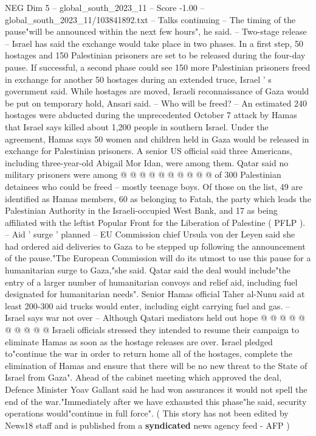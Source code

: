 \begin{textsample}{NEG Dim 5 – global\_south\_2023\_11 – Score -1.00 – global\_south\_2023\_11/103841892.txt}  \label{ex:f5_neg_173}
-- Talks continuing -- The timing of the pause"will be announced within the next few hours", he said. -- Two-stage release -- Israel has said the exchange would take place in two phases.
In a first step, 50 hostages and 150 Palestinian prisoners are set to be released during the four-day pause.
If successful, a second phase could see 150 more Palestinian prisoners freed in exchange for another 50 hostages during an extended truce, Israel ' s government said.
While hostages are moved, Israeli reconnaissance of Gaza would be put on temporary hold, Ansari said. -- Who will be freed? -- An estimated 240 hostages were abducted during the unprecedented October 7 attack by Hamas that Israel says killed about 1,200 people in southern Israel.
Under the agreement, Hamas says 50 women and children held in Gaza would be released in exchange for Palestinian prisoners.
A senior US official said three Americans, including three-year-old Abigail Mor Idan, were among them.
Qatar said no military prisoners were among @ @ @ @ @ @ @ @ @ @ of 300 Palestinian detainees who could be freed -- mostly teenage boys.
Of those on the list, 49 are identified as Hamas members, 60 as belonging to Fatah, the party which leads the Palestinian Authority in the Israeli-occupied West Bank, and 17 as being affiliated with the leftist Popular Front for the Liberation of Palestine ( PFLP ). -- Aid ' surge ' planned -- EU Commission chief Ursula von der Leyen said she had ordered aid deliveries to Gaza to be stepped up following the announcement of the pause."The European Commission will do its utmost to use this pause for a humanitarian surge to Gaza,"she said.
Qatar said the deal would include"the entry of a larger number of humanitarian convoys and relief aid, including fuel designated for humanitarian needs".
Senior Hamas official Taher al-Nunu said at least 200-300 aid trucks would enter, including eight carrying fuel and gas. -- Israel says war not over -- Although Qatari mediators held out hope @ @ @ @ @ @ @ @ @ @ Israeli officials stressed they intended to resume their campaign to eliminate Hamas as soon as the hostage releases are over.
Israel pledged to"continue the war in order to return home all of the hostages, complete the elimination of Hamas and ensure that there will be no new threat to the State of Israel from Gaza".
Ahead of the cabinet meeting which approved the deal, Defence Minister Yoav Gallant said he had won assurances it would not spell the end of the war."Immediately after we have exhausted this phase"he said, security operations would"continue in full force". ( This story has not been edited by News18 staff and is published from a \textbf{syndicated} news agency feed - AFP )

\end{textsample}
